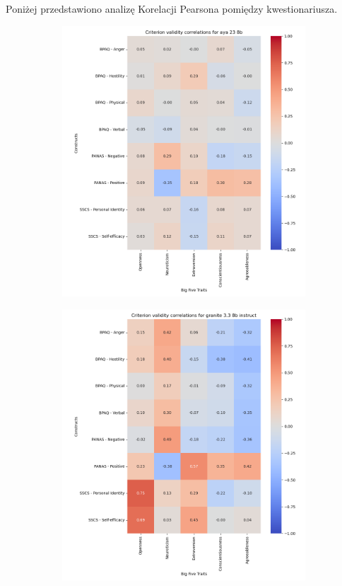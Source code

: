 \documentclass{article}
\begin{document}
Poniżej przedstawiono analizę Korelacji Pearsona pomiędzy kwestionariusza.
\newpage
\begin{figure}[H]
    \centering
    \begin{subfigure}{0.38\textwidth}
        \centering
        \includegraphics[width=\linewidth]{../Prompt_code/plots/aya-23-8b/crit_val_correlation.png}
    \end{subfigure}
    \begin{subfigure}{0.38\textwidth}
        \centering
        \includegraphics[width=\linewidth]{../Prompt_code/plots/granite-3.3-8b-instruct/crit_val_correlation.png}

\end{subfigure}
\end{figure}
\end{document}
